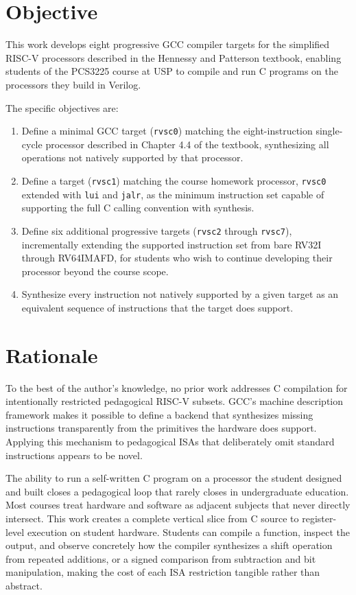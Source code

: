 \section{Objective}

This work develops eight progressive GCC compiler targets for the simplified RISC-V processors
described in the Hennessy and Patterson textbook, enabling students of the PCS3225 course at USP to
compile and run C programs on the processors they build in Verilog.

The specific objectives are:

\begin{enumerate}
  \item Define a minimal GCC target (\texttt{rvsc0}) matching the eight-instruction single-cycle
        processor described in Chapter 4.4 of the textbook, synthesizing all operations not natively
        supported by that processor.
  \item Define a target (\texttt{rvsc1}) matching the course homework processor, \texttt{rvsc0}
        extended with \texttt{lui} and \texttt{jalr}, as the minimum instruction set capable of
        supporting the full C calling convention with synthesis.
  \item Define six additional progressive targets (\texttt{rvsc2} through \texttt{rvsc7}),
        incrementally extending the supported instruction set from bare RV32I through RV64IMAFD,
        for students who wish to continue developing their processor beyond the course scope.
  \item Synthesize every instruction not natively supported by a given target as an equivalent
        sequence of instructions that the target does support.
\end{enumerate}

\section{Rationale}

To the best of the author's knowledge, no prior work addresses C compilation for intentionally
restricted pedagogical RISC-V subsets. GCC's machine description framework \cite{gcc-internals} makes
it possible to define a backend that synthesizes missing instructions transparently from the primitives
the hardware does support. Applying this mechanism to pedagogical ISAs that deliberately omit standard
instructions appears to be novel.

The ability to run a self-written C program on a processor the student designed and built closes a
pedagogical loop that rarely closes in undergraduate education. Most courses treat hardware and software
as adjacent subjects that never directly intersect. This work creates a complete vertical slice from C
source to register-level execution on student hardware. Students can compile a function, inspect the
output, and observe concretely how the compiler synthesizes a shift operation from repeated additions,
or a signed comparison from subtraction and bit manipulation, making the cost of each ISA restriction
tangible rather than abstract.

